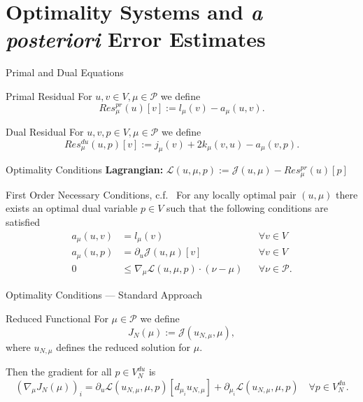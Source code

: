\section{Optimality Systems and \textit{a posteriori} Error Estimates}

\begin{frame}{Primal and Dual Equations}
    \begin{block}{Primal Residual}
        For $u, v \in V, \mu \in \mathcal{P}$ we define
        \begin{equation*}
            Res_\mu^{pr}(u)[v] := l_\mu(v) - a_\mu(u, v).
        \end{equation*}
    \end{block}
    \begin{block}{Dual Residual}
        For $u, v, p \in V, \mu \in \mathcal{P}$ we define
        \begin{equation*}
            Res_\mu^{du}(u, p)[v] := j_\mu(v) + 2 k_\mu(v, u) - a_\mu(v, p).
        \end{equation*}
    \end{block}
\end{frame}

\begin{frame}{Optimality Conditions}
    \textbf{Lagrangian:} $\mathcal{L}(u, \mu, p) := \mathcal{J}(u, \mu) - Res_\mu^{pr}(u)[p]$

    \begin{block}{First Order Necessary Conditions, c.f.~\cite{Keil2021}}
        For any locally optimal pair $(u, \mu)$ there exists an optimal dual variable $p \in V$ such that the following conditions are satisfied
        \begin{align*}
            a_\mu(u, v) &= l_\mu(v) &&\forall v \in V \\
            a_\mu(u, p) &= \partial_u \mathcal{J}(u, \mu)[v] &&\forall v \in V \\
            0 &\leq \nabla_\mu \mathcal{L}(u, \mu, p) \cdot (\nu - \mu) &&\forall \nu \in \mathcal{P}.
        \end{align*}
    \end{block}
\end{frame}

\begin{frame}{Optimality Conditions --- Standard Approach}
    \begin{block}{Reduced Functional}
        For $\mu \in \mathcal{P}$ we define
        \begin{equation*}
            J_N(\mu) := \mathcal{J}(u_{N, \mu}, \mu),
        \end{equation*}
        where $u_{N, \mu}$ defines the reduced solution for $\mu$.
    \end{block}
    Then the gradient for all $p \in V_N^{du}$ is
    \begin{equation*}
        {\left( \nabla_\mu J_N(\mu) \right)}_i = \partial_u \mathcal{L}(u_{N, \mu}, \mu, p)[d_{\mu_i} u_{N, \mu}] + \partial_{\mu_i} \mathcal{L}(u_{N, \mu}, \mu, p) \quad \forall p \in V_N^{du}.
    \end{equation*}
\end{frame}

